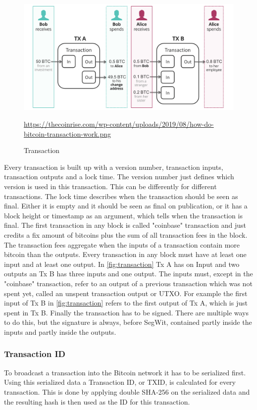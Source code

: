 \begin{figure}[!ht]
    \centering
    \includegraphics[width=(\textwidth * 2 / 3 )]{Ausarbeitung/images/transaction.png} \caption[Transaction]{Transaction}
    \small \url{https://thecoinrise.com/wp-content/uploads/2019/08/how-do-bitcoin-transaction-work.png}
    \label{fig:transaction}
\end{figure}
Every transaction is built up with a version number, transaction inputs, transaction outputs and a lock time.
The version number just defines which version is used in this transaction. This can be differently for different transactions.
The lock time describes when the transaction should be seen as final. Either it is empty and it should be seen as final on publication, or it has a block height or timestamp as an argument, which tells when the transaction is final.
The first transaction in any block is called "coinbase" transaction and just credits a fix amount of bitcoins plus the sum of all transaction fees in the block. The transaction fees aggregate when the inputs of a transaction contain more bitcoin than the outputs.
Every transaction in any block must have at least one input and at least one output. In \autoref{fig:transaction} Tx A has on Input and two outputs an Tx B has three inputs and one output. The inputs must, except in the "coinbase" transaction, refer to an output of a previous transaction which was not spent yet, called an unspent transaction output or UTXO. For example the first input of Tx B in \autoref{fig:transaction} refers to the first output of Tx A, which is just spent in Tx B.
Finally the transaction has to be signed. There are multiple ways to do this, but the signature is always, before SegWit, contained partly inside the inputs and partly inside the outputs.

\subsubsection{Transaction ID}
To broadcast a transaction into the Bitcoin network it has to be serialized first. Using this serialized data a Transaction ID, or TXID, is calculated for every transaction. This is done by applying double SHA-256 on the serialized data and the resulting hash is then used as the ID for this transaction.


